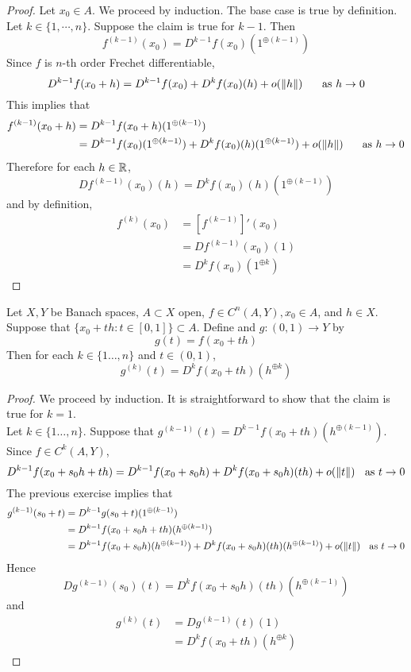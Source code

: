 \documentclass{book}
\begin{document}
	\begin{proof}
	Let $x_0 \in A$. We proceed by induction. The base case is true by definition. Let $k \in \{1, \cdots, n\}$. Suppose the claim is true for $k-1$. Then $$f^{(k-1)}(x_0) = D^{k-1}f(x_0)(1^{\oplus (k-1)})$$
	Since $f$ is $n$-th order Frechet differentiable, $$D^{k-1}f(x_0+h) = D^{k-1}f(x_0) + D^kf(x_0)(h) + o(\|h\|) \hspace{.5cm} \text{ as } h \rightarrow 0$$ 
	This implies that 
	\begin{align*}
	f^{(k-1)}(x_0+h) 
	&=  D^{k-1}f(x_0+h)(1^{\oplus (k-1)}) \\
	&= D^{k-1}f(x_0)(1^{\oplus (k-1)}) + D^kf(x_0)(h)(1^{\oplus (k-1)}) + o(\|h\|) \hspace{.5cm} \text{ as } h \rightarrow 0
	\end{align*}
	Therefore for each $h \in \mathbb{R}$, $$Df^{(k-1)}(x_0)(h) = D^kf(x_0)(h)(1^{\oplus (k-1)})$$
	and by definition,
	\begin{align*}
	f^{(k)}(x_0) 
	&= [f^{(k-1)}]'(x_0) \\
	&= Df^{(k-1)}(x_0)(1) \\
	&=  D^kf(x_0)(1^{\oplus k})
	\end{align*}
	\end{proof}
	
	
	
	
	\begin{ex} \lex{}
	Let $X,Y$ be Banach spaces, $A \subset X$ open, $f \in C^n(A, Y), x_0 \in A$, and $h \in X$. Suppose that $\{x_0 +th: t \in [0,1]\} \subset A$. Define and $g:(0,1) \rightarrow Y$ by $$g(t) = f(x_0 + th)$$
	Then for each $k \in \{1 \dots, n\}$ and $t \in (0,1)$, $$g^{(k)}(t) = D^kf(x_0 + th)(h^{\oplus k})$$
	\end{ex}
	
	\begin{proof}
	We proceed by induction. It is straightforward to show that the claim is true for $k=1$.\\
	Let $k \in \{1 \dots, n\}$. Suppose that $g^{(k-1)}(t) = D^{k-1}f(x_0 + th)(h^{\oplus (k-1)})$. Since $f \in C^k(A, Y)$, $$D^{k-1}f(x_0 + s_0h + th)= D^{k-1}f(x_0 + s_0h) + D^k f(x_0 + s_0h)(th) + o(\|t\|) \hspace{.2cm} \text{ as }t \rightarrow 0 $$ 
	The previous exercise implies that 
	\begin{align*}
	g^{(k-1)}(s_0 + t)
	&= D^{k-1}g(s_0+t)(1^{\oplus (k-1)}) \\
	&= D^{k-1}f(x_0 + s_0h + th)(h^{\oplus (k-1)}) \\
	&= D^{k-1}f(x_0 + s_0h)(h^{\oplus (k-1)}) + D^kf(x_0 + s_0h)(th)(h^{\oplus (k-1)}) + o(\|t\|) \hspace{.2cm} \text{ as }t \rightarrow 0
	\end{align*}
	Hence $$Dg^{(k-1)}(s_0)(t) = D^kf(x_0 + s_0h)(th)(h^{\oplus (k-1)})$$ 
	and 
	\begin{align*}
	g^{(k)}(t)
	&= Dg^{(k-1)}(t)(1) \\
	&= D^kf(x_0 + th)(h^{\oplus k})
	\end{align*}
	\end{proof}
	
\end{document}
